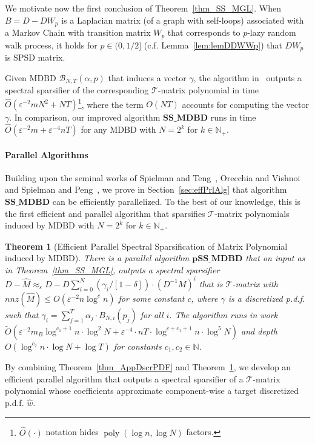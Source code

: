 \documentclass[11pt]{article}
\newcommand{\SPSD}{\mathrm{SPSD}}
\newcommand{\MDBD}{\mathrm{MDBD}}
\newcommand{\GL}{\mathcal{T}}
\newcommand{\BNTap}{\mathcal{B}_{N,T}(\alpha,p)}
\newcommand{\SSMDBD}{\mathrm{\mathbf{SS\_MDBD}}}
\newcommand{\pSSMDBD}{\mathrm{\mathbf{pSS\_MDBD}}}
\newcommand{\wO}{\widetilde{O}}
\newcommand{\hM}{\widehat{M}}
\newcommand{\hO}{\widehat{O}}
\newcommand{\hw}{\widehat{w}}
\newcommand{\Di}{D^{-1}}
\newcommand{\N}{\mathbb{N}}
\newcommand{\poly}{\operatorname{poly}}
\newcommand{\eps}{\epsilon}
\renewcommand{\leq}{\leqslant}
\newcommand{\lemref}[1]{Lemma~\ref{lem:#1}}
\renewcommand{\eps}{\varepsilon}
\newtheorem{thm}{Theorem}  \newtheorem{fact}[thm]{Fact}
\numberwithin{thm}{section}
\begin{document}
We motivate now the first conclusion of Theorem~\ref{thm_SS_MGL}. When $B=D-D W_p$ is a Laplacian matrix (of a graph with self-loops) associated with a Markov Chain with transition matrix $W_p$ that corresponds to $p$-lazy random walk process, it holds for $p\in(0,1/2]$ (c.f. \lemref{lemDDWWp}) that $D W_p$ is $\SPSD$ matrix.

Given $\MDBD$ $\BNTap$ that induces a vector $\gamma$, the algorithm in~\cite[Theorem 2]{CCLPT15} outputs a spectral sparsifier of the corresponding $\GL$-matrix polynomial in time $\hO(\eps^{-2} m N^2+NT)$\footnote{$\hO(\cdot)$ notation hides $\poly(\log n,\log N)$ factors.}, where the term $O(NT)$ accounts for computing the vector $\gamma$. In comparison, our improved algorithm $\SSMDBD$ runs in time $\hO(\eps^{-2}m+\eps^{-4}nT)$ for any $\MDBD$ with $N=2^k$ for $k\in\N_+$.


\paragraph{Parallel Algorithms}

Building upon the seminal works of Spielman and Teng~\cite{ST11}, Orecchia and Vishnoi~\cite{OV11} and Spielman and Peng~\cite{PS14}, we prove in Section~\ref{sec:effPrlAlg} that algorithm $\SSMDBD$ can be efficiently parallelized. To the best of our knowledge, this is the first efficient and parallel algorithm that sparsifies $\GL$-matrix polynomials induced by $\MDBD$ with $N=2^k$ for $k\in\N_+$.


\begin{thm}[Efficient Parallel Spectral Sparsification of Matrix Polynomial induced by $\MDBD$]\label{thm_prl_SS_MGL}
There is a parallel algorithm $\pSSMDBD$ that on
input as in Theorem~\ref{thm_SS_MGL}, outputs a spectral sparsifier $D-\hM \approx_{\eps}D-D\sum_{i=0}^{N}(\gamma_{i}/[1-\delta])\cdot(\Di M)^{i}$ that is $\GL$-matrix with $nnz(\hM)\leq O(\eps^{-2}n\log^{c} n)$ for some constant $c$, where $\gamma$ is a discretized p.d.f. such that $\gamma_{i}=\sum_{j=1}^{T}\alpha_{j}\cdot B_{N,i}(p_{j})$ for all $i$. The algorithm runs in work $\wO(\eps^{-2}m_B\log^{c_1+1}n\cdot\log^{2}N + \eps^{-4}\cdot nT\cdot\log^{c+c_1+1}n\cdot\log^{5}N)$ and depth $O(\log^{c_2}n\cdot\log N+\log T)$ for constants $c_1,c_2\in\N$.
\end{thm}

By combining Theorem~\ref{thm_AppDscrPDF} and Theorem~\ref{thm_prl_SS_MGL}, we develop an efficient parallel algorithm that outputs a spectral sparsifier of a $\GL$-matrix polynomial whose coefficients approximate component-wise a target discretized p.d.f. $\hw$.
\end{document}
